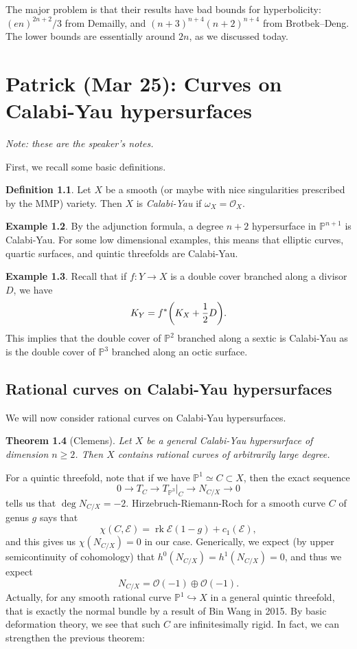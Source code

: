 \documentclass[leqno, openany]{memoir}
\newtheorem{thm}{Theorem}[section]
\theoremstyle{definition}
\newtheorem{defn}[thm]{Definition}
\newtheorem{exm}[thm]{Example}
\theoremstyle{remark}
\theoremstyle{plain}
\theoremstyle{definition}
\theoremstyle{remark}
\renewcommand{\P}{\mathbb{P}}
\newcommand{\mc}[1]{\mathcal{#1}}
\newcommand{\on}[1]{\operatorname{#1}}
\begin{document}
The major problem is that their results have bad bounds for hyperbolicity: $(en)^{2n+2}/3$ from Demailly, and $(n+3)^{n+4}(n+2)^{n+4}$ from Brotbek--Deng. The lower bounds are essentially around $2n$, as we discussed today.

\chapter{Patrick (Mar 25): Curves on Calabi-Yau hypersurfaces}%

\textit{Note: these are the speaker's notes.}

First, we recall some basic definitions.

\begin{defn}
    Let $X$ be a smooth (or maybe with nice singularities prescribed by the MMP) variety. Then $X$ is \textit{Calabi-Yau} if $\omega_X = \mc{O}_X$.
\end{defn}

\begin{exm}
    By the adjunction formula, a degree $n+2$ hypersurface in $\P^{n+1}$ is Calabi-Yau. For some low dimensional examples, this means that elliptic curves, quartic surfaces, and quintic threefolds are Calabi-Yau.
\end{exm}

\begin{exm}
    Recall that if $f \colon Y \to X$ is a double cover branched along a divisor $D$, we have
    \[ K_Y = f^* \qty(K_X + \frac{1}{2} D). \]
    This implies that the double cover of $\P^2$ branched along a sextic is Calabi-Yau as is the double cover of $\P^3$ branched along an octic surface.
\end{exm}

\section{Rational curves on Calabi-Yau hypersurfaces}

We will now consider rational curves on Calabi-Yau hypersurfaces.

\begin{thm}[Clemens]
    Let $X$ be a general Calabi-Yau hypersurface of dimension $n \geq 2$. Then $X$ contains rational curves of arbitrarily large degree.
\end{thm}

For a quintic threefold, note that if we have $\P^1 \simeq C \subset X$, then the exact sequence
\[ 0 \to T_{C} \to T_{\P^3}|_C \to N_{C/X} \to 0 \]
tells us that $\deg N_{C/X} = -2$. Hirzebruch-Riemann-Roch for a smooth curve $C$ of genus $g$ says that
\[ \chi(C, \mc{E}) = \on{rk} \mc{E} (1-g) + c_1(\mc{E}), \]
and this gives us $\chi(N_{C/X}) = 0$ in our case. Generically, we expect (by upper semicontinuity of cohomology) that $h^0(N_{C/X}) = h^1(N_{C/X}) = 0$, and thus we expect
\[ N_{C/X} = \mc{O}(-1) \oplus \mc{O}(-1). \]
Actually, for any smooth rational curve $\P^1 \hookrightarrow X$ in a general quintic threefold, that is exactly the normal bundle by a result of Bin Wang in 2015. By basic deformation theory, we see that such $C$ are infinitesimally rigid. In fact, we can strengthen the previous theorem:
\end{document}
